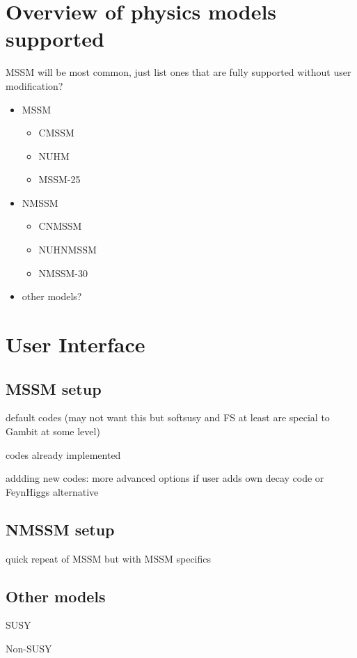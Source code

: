 \documentclass[11pt,a4paper]{article}
\begin{document}
\section{Overview of physics models supported}
MSSM will be most common, just list ones that are fully supported without user modification?
\begin{itemize} 
\item MSSM
  \begin{itemize}
  \item CMSSM  
  \item NUHM 
  \item MSSM-25
  \end{itemize} 
\item NMSSM
  \begin{itemize}
  \item CNMSSM  
  \item NUHNMSSM 
  \item NMSSM-30
  \end{itemize}
\item other models?
\end{itemize}  

\section{User Interface}

\subsection{MSSM setup} 
         default codes 
         (may not want this but softsusy and FS at least 
                         are special to Gambit at some level) 

         codes already implemented

         addding new codes: more advanced options if user adds own decay code
                            or FeynHiggs alternative
 
\subsection{NMSSM setup}
    quick repeat of MSSM but with MSSM specifics

\subsection{Other models}
    SUSY

    Non-SUSY
\end{document}
